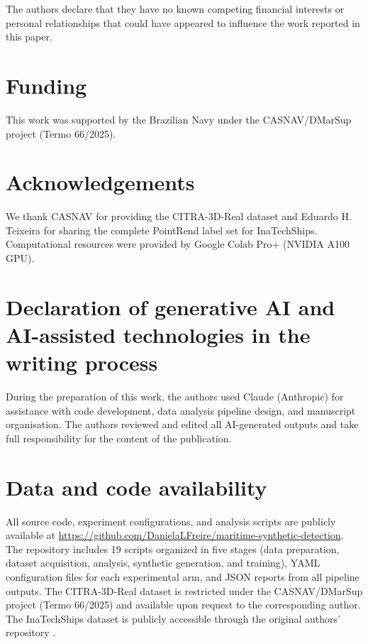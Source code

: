 \documentclass[a4paper,fleqn]{cas-dc}
\begin{document}
The authors declare that they have no known competing financial interests or personal relationships that could have appeared to influence the work reported in this paper.

\section*{Funding}

This work was supported by the Brazilian Navy under the CASNAV/DMarSup project (Termo 66/2025).

\section*{Acknowledgements}

We thank CASNAV for providing the CITRA-3D-Real dataset and Eduardo H. Teixeira for sharing the complete PointRend label set for InaTechShips. Computational resources were provided by Google Colab Pro+ (NVIDIA A100 GPU).

\section*{Declaration of generative AI and AI-assisted technologies in the writing process}

During the preparation of this work, the authors used Claude (Anthropic) for assistance with code development, data analysis pipeline design, and manuscript organisation. The authors reviewed and edited all AI-generated outputs and take full responsibility for the content of the publication.

\section*{Data and code availability}

All source code, experiment configurations, and analysis scripts are publicly available at \url{https://github.com/DanielaLFreire/maritime-synthetic-detection}. The repository includes 19 scripts organized in five stages (data preparation, dataset acquisition, analysis, synthetic generation, and training), YAML configuration files for each experimental arm, and JSON reports from all pipeline outputs. The CITRA-3D-Real dataset is restricted under the CASNAV/DMarSup project (Termo 66/2025) and available upon request to the corresponding author. The InaTechShips dataset is publicly accessible through the original authors' repository \citep{teixeira2025inatechships}.

\clearpage


\end{document}

